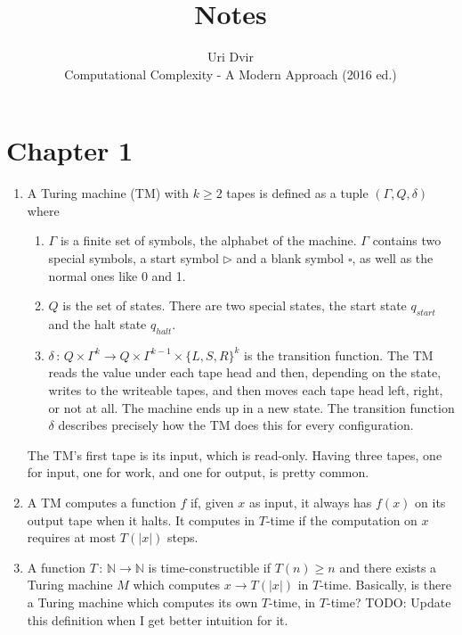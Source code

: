 \documentclass[12pt]{article}
\title{Notes}
\author{Uri Dvir \\ Computational Complexity - A Modern Approach (2016 ed.)}
\begin{document}
\maketitle

\section*{Chapter 1}

\begin{enumerate}
\item{
A Turing machine (TM) with $k \geq 2$ tapes is defined as a tuple $(\Gamma, Q, \delta)$ where
\begin{enumerate}
\item{$\Gamma$ is a finite set of symbols, the alphabet of the machine. $\Gamma$ contains two special symbols, a start symbol $\triangleright$ and a blank symbol $\square$, as well as the normal ones like 0 and 1.}
\item{$Q$ is the set of states. There are two special states, the start state $q_{start}$ and the halt state $q_{halt}$.}
\item{$\delta \,:\, Q \times \Gamma^k \rightarrow Q \times \Gamma^{k-1} \times \{ L, S, R \}^k$ is the transition function. The TM reads the value under each tape head and then, depending on the state, writes to the writeable tapes, and then moves each tape head left, right, or not at all. The machine ends up in a new state. The transition function $\delta$ describes precisely how the TM does this for every configuration.}
\end{enumerate}
The TM's first tape is its input, which is read-only. Having three tapes, one for input, one for work, and one for output, is pretty common.
}
\item{A TM computes a function $f$ if, given $x$ as input, it always has $f(x)$ on its output tape when it halts. It computes in $T$-time if the computation on $x$ requires at most $T(|x|)$ steps.}
\item{
A function $T \,:\, \mathbb{N} \rightarrow \mathbb{N}$ is time-constructible if $T(n) \geq n$ and there exists a Turing machine $M$ which computes $x \rightarrow T(|x|)$ in $T$-time. Basically, is there a Turing machine which computes its own $T$-time, in $T$-time? TODO: Update this definition when I get better intuition for it.
}
\end{enumerate}
\end{document}
